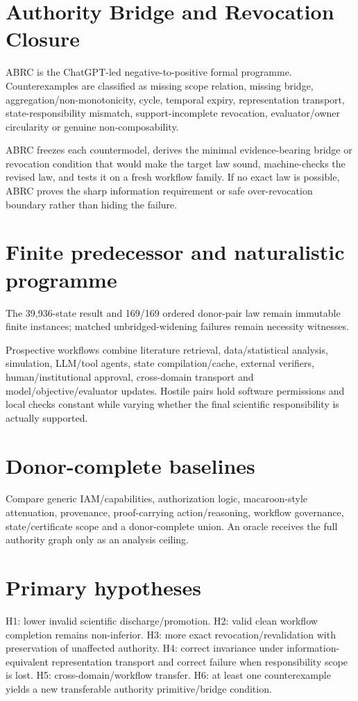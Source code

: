 \documentclass[11pt]{article}
\begin{document}
\section{Authority Bridge and Revocation Closure}
ABRC is the ChatGPT-led negative-to-positive formal programme. Counterexamples are classified as missing scope relation, missing bridge, aggregation/non-monotonicity, cycle, temporal expiry, representation transport, state-responsibility mismatch, support-incomplete revocation, evaluator/owner circularity or genuine non-composability.

ABRC freezes each countermodel, derives the minimal evidence-bearing bridge or revocation condition that would make the target law sound, machine-checks the revised law, and tests it on a fresh workflow family. If no exact law is possible, ABRC proves the sharp information requirement or safe over-revocation boundary rather than hiding the failure.

\section{Finite predecessor and naturalistic programme}
The 39,936-state result and 169/169 ordered donor-pair law remain immutable finite instances; matched unbridged-widening failures remain necessity witnesses.

Prospective workflows combine literature retrieval, data/statistical analysis, simulation, LLM/tool agents, state compilation/cache, external verifiers, human/institutional approval, cross-domain transport and model/objective/evaluator updates. Hostile pairs hold software permissions and local checks constant while varying whether the final scientific responsibility is actually supported.

\section{Donor-complete baselines}
Compare generic IAM/capabilities, authorization logic, macaroon-style attenuation, provenance, proof-carrying action/reasoning, workflow governance, state/certificate scope and a donor-complete union. An oracle receives the full authority graph only as an analysis ceiling.

\section{Primary hypotheses}
H1: lower invalid scientific discharge/promotion. H2: valid clean workflow completion remains non-inferior. H3: more exact revocation/revalidation with preservation of unaffected authority. H4: correct invariance under information-equivalent representation transport and correct failure when responsibility scope is lost. H5: cross-domain/workflow transfer. H6: at least one counterexample yields a new transferable authority primitive/bridge condition.
\end{document}
